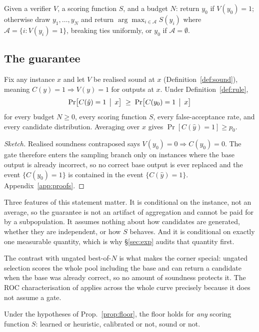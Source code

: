 \documentclass[11pt]{article}
\begin{document}
\begin{definition}\label{def:rule}
Given a verifier $V$, a scoring function $S$, and a budget $N$: return $y_0$ if $V(y_0)=1$; otherwise draw $y_1,\dots,y_N$ and return $\arg\max_{i\in\mathcal{A}}S(y_i)$ where $\mathcal{A}=\{i:V(y_i)=1\}$, breaking ties uniformly, or $y_0$ if $\mathcal{A}=\emptyset$.
\end{definition}

\subsection{The guarantee}\label{sec:guarantee}
\begin{proposition}\label{prop:floor}
Fix any instance $x$ and let $V$ be realised sound at $x$ (Definition~\ref{def:sound}), meaning $C(y)=1\Rightarrow V(y)=1$ for outputs at $x$. Under Definition~\ref{def:rule},
\[
\Pr\bigl[C(\hat y)=1 \,\bigm|\, x\bigr]\;\ge\;\Pr\bigl[C(y_0)=1 \,\bigm|\, x\bigr]
\]
for every budget $N\ge0$, every scoring function $S$, every false-acceptance rate, and every candidate distribution. Averaging over $x$ gives $\Pr[C(\hat y)=1]\ge p_0$.
\end{proposition}
\begin{proof}[Sketch]
Realised soundness contraposed says $V(y_0)=0\Rightarrow C(y_0)=0$. The gate therefore enters the sampling branch only on instances where the base output is already incorrect, so no correct base output is ever replaced and the event $\{C(y_0)=1\}$ is contained in the event $\{C(\hat y)=1\}$. Appendix~\ref{app:proofs}.
\end{proof}

Three features of this statement matter. It is conditional on the instance, not an average, so the guarantee is not an artifact of aggregation and cannot be paid for by a subpopulation. It assumes nothing about how candidates are generated, whether they are independent, or how $S$ behaves. And it is conditional on exactly one measurable quantity, which is why \S\ref{sec:exp} audits that quantity first.

The contrast with ungated best-of-$N$ is what makes the corner special: ungated selection scores the whole pool including the base and can return a candidate when the base was already correct, so no amount of soundness protects it. The ROC characterisation of \citet{dorner2025rocnreroll} applies across the whole curve precisely because it does not assume a gate.

\begin{corollary}\label{cor:compose}
Under the hypotheses of Prop.~\ref{prop:floor}, the floor holds for \emph{any} scoring function $S$: learned or heuristic, calibrated or not, sound or not.
\end{corollary}
\end{document}
